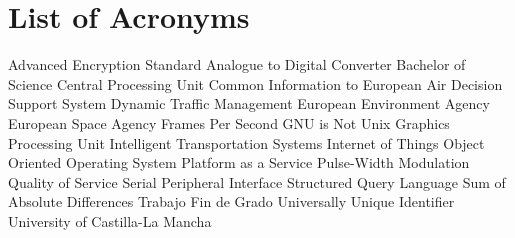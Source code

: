 \chapter{List of Acronyms}

{\small
\begin{acronym}[XXXXXXXX]
			{Advanced Encryption Standard}
			{Analogue to Digital Converter}
			{Bachelor of Science}
			{Central Processing Unit}
		{Common Information to European Air}
			{Decision Support System}
			{Dynamic Traffic Management}
			{European Environment Agency}
			{European Space Agency}
			{Frames Per Second}
	     	{\acs{GNU} is Not Unix}
			{Graphics Processing Unit}
			{Intelligent Transportation Systems}
	 		{Internet of Things}
			{Object Oriented}
			{Operating System}
			{Platform as a Service}
			{Pulse-Width Modulation}
			{Quality of Service}
			{Serial Peripheral Interface}
			{Structured Query Language}
			{Sum of Absolute Differences}
			{Trabajo Fin de Grado}
			{Universally Unique Identifier}
			{University of Castilla-La Mancha}
\end{acronym}
}